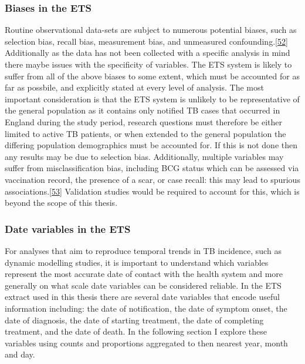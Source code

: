 \documentclass[11pt,twoside]{bristolthesis}
\begin{document}
  \hypertarget{biases-in-the-ets}{%
  \subsubsection{Biases in the ETS}\label{biases-in-the-ets}}
  
  Routine observational data-sets are subject to numerous potential biases, such as selection bias, recall bias, measurement bias, and unmeasured confounding.{[}\protect\hyperlink{ref-Benchimol2016a}{52}{]} Additionally as the data has not been collected with a specific analysis in mind there maybe issues with the specificity of variables. The ETS system is likely to suffer from all of the above biases to some extent, which must be accounted for as far as possbile, and explicitly stated at every level of analysis. The most important consideration is that the ETS system is unlikely to be representative of the general population as it contains only notified TB cases that occurred in England during the study period, research questions must therefore be either limited to active TB patients, or when extended to the general population the differing population demographics must be accounted for. If this is not done then any results may be due to selection bias. Additionally, multiple variables may suffer from misclassification bias, including BCG status which can be assessed via vaccination record, the presence of a scar, or case recall: this may lead to spurious associations.{[}\protect\hyperlink{ref-Fewell2007}{53}{]} Validation studies would be required to account for this, which is beyond the scope of this thesis.
  
  \hypertarget{date-variables-in-the-ets}{%
  \subsubsection{Date variables in the ETS}\label{date-variables-in-the-ets}}
  
  For analyses that aim to reproduce temporal trends in TB incidence, such as dynamic modelling studies, it is important to understand which variables represent the most accurate date of contact with the health system and more generally on what scale date variables can be considered reliable. In the ETS extract used in this thesis there are several date variables that encode useful information including: the date of notification, the date of symptom onset, the date of diagnosis, the date of starting treatment, the date of completing treatment, and the date of death. In the following section I explore these variables using counts and proportions aggregated to then nearest year, month and day.
  
\end{document}
